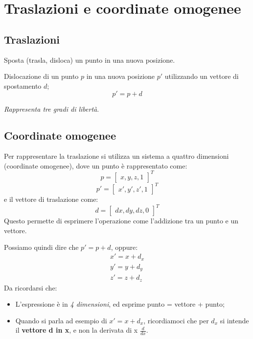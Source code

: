 %
%
\section{Traslazioni e coordinate omogenee}
%
\subsection{Traslazioni} Sposta (trasla, disloca) un punto in una nuova posizione.
\begin{definition}
    Dislocazione di un punto $ p $ in una nuova posizione $ p' $ utilizzando un vettore di spostamento $ d $;
    \[
        p' = p + d
    \]
\end{definition}
\emph{Rappresenta tre gradi di libertà}.
%
\subsection{Coordinate omogenee}
Per rappresentare la traslazione si utilizza un sistema a quattro dimensioni (coordinate omogenee), dove un punto è rappresentato come:
\[
    p = \begin{bmatrix}
        x, y, z, 1
    \end{bmatrix}^{T}
\]
\[
    p'= \begin{bmatrix}
        x',y',z',1
    \end{bmatrix}^{T}
\]
e il vettore di traslazione come:
\[
    d = \begin{bmatrix}
        dx, dy, dz, 0
    \end{bmatrix}^{T}
\]
Questo permette di esprimere l'operazione come l'addizione tra un punto e un vettore.
\begin{definition}
    Possiamo quindi dire che $ p' = p + d $, oppure:
    \begin{align*}
        x' = x + d_{x} \\
        y' = y + d_{y} \\
        z' = z + d_{z}
    \end{align*}
    Da ricordarsi che:
    \begin{itemize}
        \item L'espressione è in \emph{4 dimensioni}, ed esprime punto = vettore + punto;
        \item Quando si parla ad esempio di $ x' = x + d_{x} $, ricordiamoci che per $ d_{x} $ si intende il \textbf{vettore d in x}, e non la derivata di x $ \frac{d}{dx} $.
    \end{itemize}
\end{definition}

